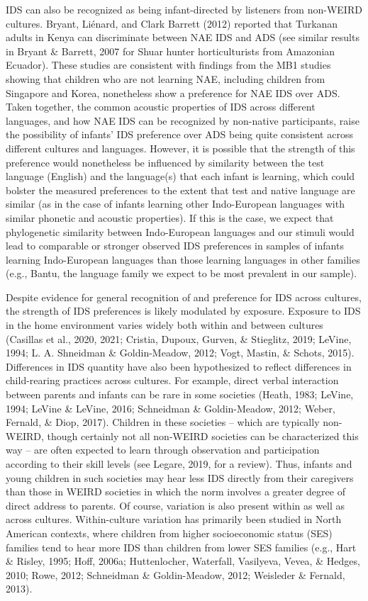 \documentclass[
  english,
  ,man,floatsintext]{apa6}
\begin{document}
IDS can also be recognized as being infant-directed by listeners from non-WEIRD cultures. Bryant, Liénard, and Clark Barrett (2012) reported that Turkanan adults in Kenya can discriminate between NAE IDS and ADS (see similar results in Bryant \& Barrett, 2007 for Shuar hunter horticulturists from Amazonian Ecuador). These studies are consistent with findings from the MB1 studies showing that children who are not learning NAE, including children from Singapore and Korea, nonetheless show a preference for NAE IDS over ADS. Taken together, the common acoustic properties of IDS across different languages, and how NAE IDS can be recognized by non-native participants, raise the possibility of infants' IDS preference over ADS being quite consistent across different cultures and languages. However, it is possible that the strength of this preference would nonetheless be influenced by similarity between the test language (English) and the language(s) that each infant is learning, which could bolster the measured preferences to the extent that test and native language are similar (as in the case of infants learning other Indo-European languages with similar phonetic and acoustic properties). If this is the case, we expect that phylogenetic similarity between Indo-European languages and our stimuli would lead to comparable or stronger observed IDS preferences in samples of infants learning Indo-European languages than those learning languages in other families (e.g., Bantu, the language family we expect to be most prevalent in our sample).

Despite evidence for general recognition of and preference for IDS across cultures, the strength of IDS preferences is likely modulated by exposure. Exposure to IDS in the home environment varies widely both within and between cultures (Casillas et al., 2020, 2021; Cristia, Dupoux, Gurven, \& Stieglitz, 2019; LeVine, 1994; L. A. Shneidman \& Goldin-Meadow, 2012; Vogt, Mastin, \& Schots, 2015). Differences in IDS quantity have also been hypothesized to reflect differences in child-rearing practices across cultures. For example, direct verbal interaction between parents and infants can be rare in some societies (Heath, 1983; LeVine, 1994; LeVine \& LeVine, 2016; Schneidman \& Goldin-Meadow, 2012; Weber, Fernald, \& Diop, 2017). Children in these societies -- which are typically non-WEIRD, though certainly not all non-WEIRD societies can be characterized this way -- are often expected to learn through observation and participation according to their skill levels (see Legare, 2019, for a review). Thus, infants and young children in such societies may hear less IDS directly from their caregivers than those in WEIRD societies in which the norm involves a greater degree of direct address to parents. Of course, variation is also present within as well as across cultures. Within-culture variation has primarily been studied in North American contexts, where children from higher socioeconomic status (SES) families tend to hear more IDS than children from lower SES families (e.g., Hart \& Risley, 1995; Hoff, 2006a; Huttenlocher, Waterfall, Vasilyeva, Vevea, \& Hedges, 2010; Rowe, 2012; Schneidman \& Goldin-Meadow, 2012; Weisleder \& Fernald, 2013).
\end{document}
